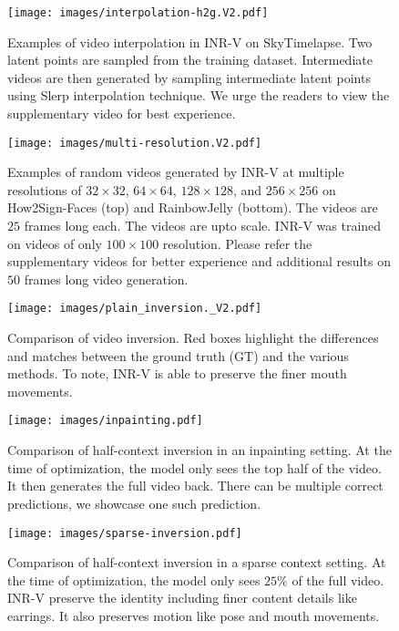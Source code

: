 \documentclass[10pt]{article} \usepackage[accepted]{tmlr}
\begin{document}
\begin{figure}[t]
  \centering
  \texttt{[image: images/interpolation-h2g.V2.pdf]}
  \caption{Examples of video interpolation in INR-V on SkyTimelapse. Two latent points are sampled from the training dataset. Intermediate videos are then generated by sampling intermediate latent points using Slerp interpolation technique. We urge the readers to view the supplementary video for best experience. }
  \label{fig:interpolation-sky-appendix}
\end{figure}

\begin{figure}[t]
  \centering
  \texttt{[image: images/multi-resolution.V2.pdf]}
  \caption{Examples of random videos generated by INR-V at multiple resolutions of $32 \times 32$, $64 \times 64$, $128 \times 128$, and $256 \times 256$ on How2Sign-Faces (top) and RainbowJelly (bottom). The videos are $25$ frames long each. The videos are upto scale. INR-V was trained on videos of only $100 \times 100$ resolution. Please refer the supplementary videos for better experience and additional results on $50$ frames long video generation. }
  \label{fig:multi-resolution-appendix}
\end{figure}

\begin{figure}[t]
  \centering
  \texttt{[image: images/plain\_inversion.\_V2.pdf]}
  \caption{Comparison of video inversion. Red boxes highlight the differences and matches between the ground truth (GT) and the various methods. To note, INR-V is able to preserve the finer mouth movements.}
  \label{fig:plain-inversion-appendix}
\end{figure}

\begin{figure}[t]
  \centering
  \texttt{[image: images/inpainting.pdf]}
  \caption{Comparison of half-context inversion in an inpainting setting. At the time of optimization, the model only sees the top half of the video. It then generates the full video back. There can be multiple correct predictions, we showcase one such prediction.}
  \label{fig:inpainting-appendix}
\end{figure}

\begin{figure}[t]
  \centering
  \texttt{[image: images/sparse-inversion.pdf]}
  \caption{Comparison of half-context inversion in a sparse context setting. At the time of optimization, the model only sees $25\%$ of the full video. INR-V preserve the identity including finer content details like earrings. It also preserves motion like pose and mouth movements.}
  \label{fig:sparse-inpainting-appendix}
\end{figure}
\end{document}
